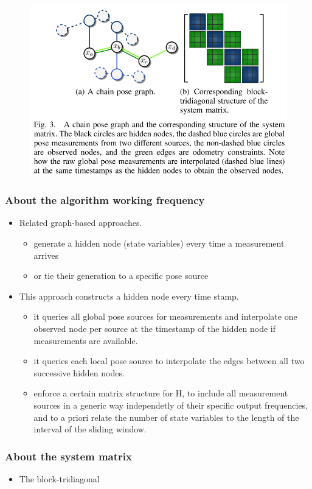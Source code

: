 \documentclass[letterpaper,11pt]{article}
\begin{document}
\begin{figure}[!ht]
	\centering
	\includegraphics[width=15cm]{./img/posegraph.png}
\end{figure}

\subsubsection{About the algorithm working frequency}

\begin{itemize}
	\item Related graph-based approaches.
	\begin{itemize}
		\item generate a hidden node (state variables) every time a measurement arrives
		\item or tie their generation to a specific pose source
	\end{itemize}
	\item This approach constructs a hidden node every time stamp.
	\begin{itemize}
		\item it queries all global pose sources for measurements and interpolate one observed node per source at the timestamp of the hidden node if measurements are available.
		\item it queries each local pose source to interpolate the edges between all two successive hidden nodes.
		\item enforce a certain matrix structure for H, to include all measurement sources in a generic way independetly of their specific output frequencies, and to a priori relate the number of state variables to the length of the interval of the sliding window.
	\end{itemize}
\end{itemize}

\subsubsection{About the system matrix}

\begin{itemize}
	\item The block-tridiagonal 
\end{itemize}
\end{document}
